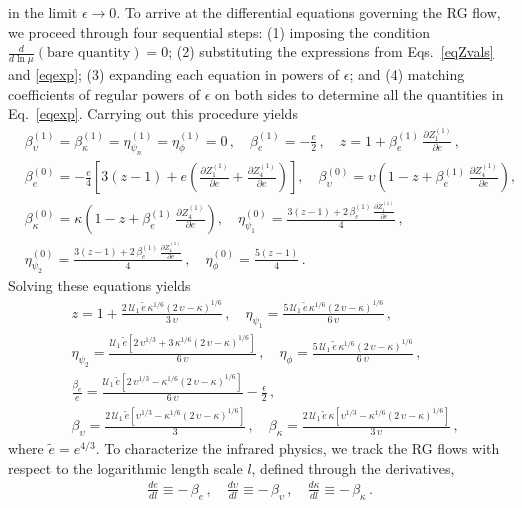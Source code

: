 in the limit $\epsilon \rightarrow 0$. To arrive at the differential 
equations governing the RG flow, we proceed through four 
sequential steps: (1) imposing the condition 
$\frac{d}{d\ln\mu}(\text{bare quantity}) = 0$; (2) substituting the 
expressions from Eqs.~\eqref{eqZvals} and \eqref{eqexp}; (3) expanding 
each equation in powers of $\epsilon$; and (4) matching coefficients of 
regular powers of $\epsilon$ on both sides to determine all the 
quantities in Eq.~\eqref{eqexp}. Carrying out this procedure yields
\begin{align}
& \beta_\upsilon^{(1)} = \beta_\kappa^{(1)} = \eta_{\psi_n}^{(1)} 
= \eta_\phi^{(1)} = 0\,, \quad
\beta_e^{(1)} = -\frac{e}{2}\,, \quad
z = 1 + \beta_e^{(1)}\,\frac{\partial Z_1^{(1)}}{\partial e}\,, \nonumber \\
& \beta_e^{(0)} = -\frac{e}{4}\left[3(z-1) + e\left(
\frac{\partial Z_1^{(1)}}{\partial e} + \frac{\partial Z_4^{(1)}}{\partial e}
\right)\right], \quad
\beta_\upsilon^{(0)} = \upsilon\left(1 - z + \beta_e^{(1)}\,
\frac{\partial Z_4^{(1)}}{\partial e}\right), \nonumber \\
& \beta_\kappa^{(0)} = \kappa\left(1 - z + \beta_e^{(1)}\,
\frac{\partial Z_4^{(1)}}{\partial e}\right), \quad
\eta_{\psi_1}^{(0)} = \frac{3(z-1) + 2\,\beta_e^{(1)}\,
\frac{\partial Z_1^{(1)}}{\partial e}}{4}\,, \nonumber \\
& \eta_{\psi_2}^{(0)} = \frac{3(z-1) + 2\,\beta_e^{(1)}\,
\frac{\partial Z_4^{(1)}}{\partial e}}{4}\,, \quad
\eta_\phi^{(0)} = \frac{5(z-1)}{4}\,.
\end{align}
Solving these equations yields
\begin{align}
\label{eqbeta}
& z = 1 + \frac{2\,\mathcal{U}_1\,\tilde{e}\,\kappa^{1/6}
(2\,\upsilon - \kappa)^{1/6}}{3\,\upsilon}\,, \quad
\eta_{\psi_1} = \frac{5\,\mathcal{U}_1\,\tilde{e}\,\kappa^{1/6}
(2\,\upsilon - \kappa)^{1/6}}{6\,\upsilon}\,, \nonumber \\
& \eta_{\psi_2} = \frac{\mathcal{U}_1\,\tilde{e}
\left[2\,\upsilon^{1/3} + 3\,\kappa^{1/6}(2\,\upsilon - \kappa)^{1/6}\right]}
{6\,\upsilon}\,, \quad
\eta_\phi = \frac{5\,\mathcal{U}_1\,\tilde{e}\,\kappa^{1/6}
(2\,\upsilon - \kappa)^{1/6}}{6\,\upsilon}\,, \nonumber \\
& \frac{\beta_e}{e} = \frac{\mathcal{U}_1\,\tilde{e}
\left[2\,\upsilon^{1/3} - \kappa^{1/6}(2\,\upsilon - \kappa)^{1/6}\right]}
{6\,\upsilon} - \frac{\epsilon}{2}\,, \nonumber \\
& \beta_\upsilon = \frac{2\,\mathcal{U}_1\,\tilde{e}
\left[\upsilon^{1/3} - \kappa^{1/6}(2\,\upsilon - \kappa)^{1/6}\right]}{3}\,, 
\quad
\beta_\kappa = \frac{2\,\mathcal{U}_1\,\tilde{e}\,\kappa
\left[\upsilon^{1/3} - \kappa^{1/6}(2\,\upsilon - \kappa)^{1/6}\right]}
{3\,\upsilon}\,,
\end{align}
where $\tilde{e} = e^{4/3}$. To characterize the infrared physics, we 
track the RG flows with respect to the logarithmic length scale $l$, 
defined through the derivatives,
\begin{align}
\frac{ d e}{ d l} \equiv - \,\beta_e\,,\quad
\frac{ d \upsilon} {d l} \equiv - \, \beta_\upsilon \,,\quad
\frac{ d \kappa} {d l} \equiv - \,\beta_\kappa \,.
\end{align}

